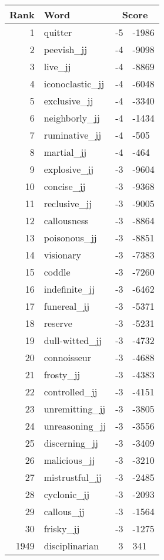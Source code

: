 \begin{longtable}[!htbp]{| rlr@{.}l |}
    \hline
    \textbf{Rank} & \textbf{Word} & \multicolumn{2}{c|}{\textbf{Score}} \\
    \hline
    \endhead
    1 & quitter & -5 & -1986 \\
    2 & peevish\_jj & -4 & -9098 \\
    3 & live\_jj & -4 & -8869 \\
    4 & iconoclastic\_jj & -4 & -6048 \\
    5 & exclusive\_jj & -4 & -3340 \\
    6 & neighborly\_jj & -4 & -1434 \\
    7 & ruminative\_jj & -4 & -505 \\
    8 & martial\_jj & -4 & -464 \\
    9 & explosive\_jj & -3 & -9604 \\
    10 & concise\_jj & -3 & -9368 \\
    11 & reclusive\_jj & -3 & -9005 \\
    12 & callousness & -3 & -8864 \\
    13 & poisonous\_jj & -3 & -8851 \\
    14 & visionary & -3 & -7383 \\
    15 & coddle & -3 & -7260 \\
    16 & indefinite\_jj & -3 & -6462 \\
    17 & funereal\_jj & -3 & -5371 \\
    18 & reserve & -3 & -5231 \\
    19 & dull-witted\_jj & -3 & -4732 \\
    20 & connoisseur & -3 & -4688 \\
    21 & frosty\_jj & -3 & -4383 \\
    22 & controlled\_jj & -3 & -4151 \\
    23 & unremitting\_jj & -3 & -3805 \\
    24 & unreasoning\_jj & -3 & -3556 \\
    25 & discerning\_jj & -3 & -3409 \\
    26 & malicious\_jj & -3 & -3210 \\
    27 & mistrustful\_jj & -3 & -2485 \\
    28 & cyclonic\_jj & -3 & -2093 \\
    29 & callous\_jj & -3 & -1564 \\
    30 & frisky\_jj & -3 & -1275 \\
    1949 & disciplinarian & 3 & 341 \\

\end{longtable}
